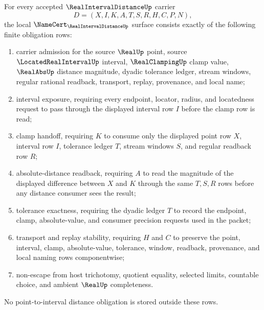 \begin{theorem}
\label{thm:real-interval-distance-namecert-obligations}
For every accepted $\RealIntervalDistanceUp$ carrier
$$
D=(X,I,K,A,T,S,R,H,C,P,N),
$$
the local $\NameCert_{\RealIntervalDistanceUp}$ surface consists exactly of the following finite obligation rows:
\begin{enumerate}
\item carrier admission for the source $\RealUp$ point, source $\LocatedRealIntervalUp$ interval, $\RealClampingUp$ clamp value, $\RealAbsUp$ distance magnitude, dyadic tolerance ledger, stream windows, regular rational readback, transport, replay, provenance, and local name;
\item interval exposure, requiring every endpoint, locator, radius, and locatedness request to pass through the displayed interval row $I$ before the clamp row is read;
\item clamp handoff, requiring $K$ to consume only the displayed point row $X$, interval row $I$, tolerance ledger $T$, stream windows $S$, and regular readback row $R$;
\item absolute-distance readback, requiring $A$ to read the magnitude of the displayed difference between $X$ and $K$ through the same $T,S,R$ rows before any distance consumer sees the result;
\item tolerance exactness, requiring the dyadic ledger $T$ to record the endpoint, clamp, absolute-value, and consumer precision requests used in the packet;
\item transport and replay stability, requiring $H$ and $C$ to preserve the point, interval, clamp, absolute-value, tolerance, window, readback, provenance, and local naming rows componentwise;
\item non-escape from host trichotomy, quotient equality, selected limits, countable choice, and ambient $\RealUp$ completeness.
\end{enumerate}
No point-to-interval distance obligation is stored outside these rows.
\end{theorem}


